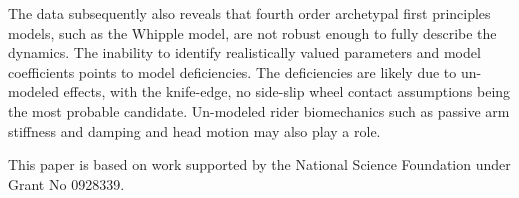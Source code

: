 \documentclass[a4paper]{article}
\begin{document}
The data subsequently also reveals that fourth order archetypal first
principles models, such as the Whipple model, are not robust enough to fully
describe the dynamics. The inability to identify realistically valued
parameters and model coefficients points to model deficiencies. The
deficiencies are likely due to un-modeled effects, with the knife-edge, no
side-slip wheel contact assumptions being the most probable candidate.
Un-modeled rider biomechanics such as passive arm stiffness and damping and
head motion may also play a role.

This paper is based on work supported by the National Science Foundation under
Grant No 0928339.
\end{document}
